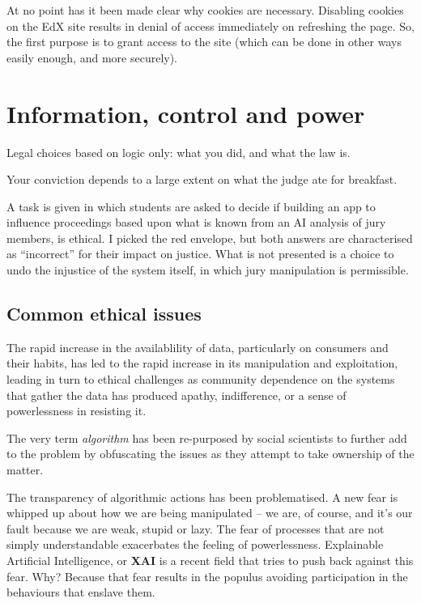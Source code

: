 \documentclass[
]{book}
\providecommand{\tightlist}{%
  \setlength{\itemsep}{0pt}\setlength{\parskip}{0pt}}
\begin{document}
At no point has it been made clear why cookies are necessary. Disabling cookies on the EdX site results in denial of access immediately on refreshing the page. So, the first purpose is to grant access to the site (which can be done in other ways easily enough, and more securely).

\hypertarget{information-control-and-power}{%
\section{Information, control and power}\label{information-control-and-power}}

\begin{description}
\tightlist
\item[Formalism]
Legal choices based on logic only: what you did, and what the law is.
\item[Realism]
Your conviction depends to a large extent on what the judge ate for breakfast.
\end{description}

A task is given in which students are asked to decide if building an app to influence proceedings based upon what is known from an AI analysis of jury members, is ethical. I picked the red envelope, but both answers are characterised as ``incorrect'' for their impact on justice. What is not presented is a choice to undo the injustice of the system itself, in which jury manipulation is permissible.

\hypertarget{common-ethical-issues}{%
\subsection{Common ethical issues}\label{common-ethical-issues}}

The rapid increase in the availablility of data, particularly on consumers and their habits, has led to the rapid increase in its manipulation and exploitation, leading in turn to ethical challenges as community dependence on the systems that gather the data has produced apathy, indifference, or a sense of powerlessness in resisting it.

The very term \emph{algorithm} has been re-purposed by social scientists to further add to the problem by obfuscating the issues as they attempt to take ownership of the matter.

The transparency of algorithmic actions has been problematised. A new fear is whipped up about how we are being manipulated -- we are, of course, and it's our fault because we are weak, stupid or lazy. The fear of processes that are not simply understandable exacerbates the feeling of powerlessness. Explainable Artificial Intelligence, or \textbf{XAI} is a recent field that tries to push back against this fear. Why? Because that fear results in the populus avoiding participation in the behaviours that enslave them.
\end{document}
